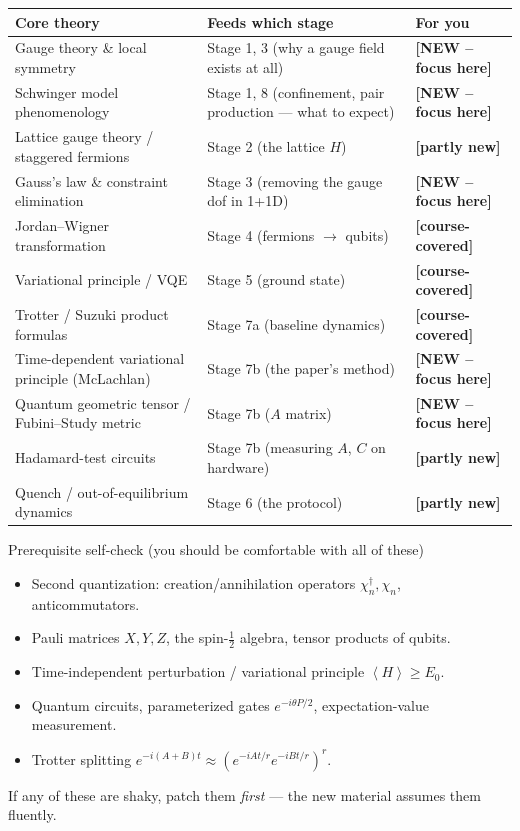 \documentclass[11pt,a4paper]{article}
\newcommand{\ev}[1]{\left\langle#1\right\rangle}
\newcommand{\half}{\tfrac{1}{2}}
\newcommand{\known}{\textcolor{green!55!black}{\textbf{[course-covered]}}}
\newcommand{\newx}{\textcolor{red!70!black}{\textbf{[NEW -- focus here]}}}
\newcommand{\partly}{\textcolor{orange!85!black}{\textbf{[partly new]}}}
\begin{document}
\begin{center}
\renewcommand{\arraystretch}{1.3}
\begin{longtable}{>{\raggedright\arraybackslash}p{} >{\raggedright\arraybackslash}p{} l}
\toprule
\textbf{Core theory} & \textbf{Feeds which stage} & \textbf{For you} \\
\midrule
\endhead
Gauge theory \& local symmetry & Stage 1, 3 (why a gauge field exists at all) & \newx \\
Schwinger model phenomenology & Stage 1, 8 (confinement, pair production --- what to expect) & \newx \\
Lattice gauge theory / staggered fermions & Stage 2 (the lattice $H$) & \partly \\
Gauss's law \& constraint elimination & Stage 3 (removing the gauge dof in 1+1D) & \newx \\
Jordan--Wigner transformation & Stage 4 (fermions $\to$ qubits) & \known \\
Variational principle / VQE & Stage 5 (ground state) & \known \\
Trotter / Suzuki product formulas & Stage 7a (baseline dynamics) & \known \\
Time-dependent variational principle (McLachlan) & Stage 7b (the paper's method) & \newx \\
Quantum geometric tensor / Fubini--Study metric & Stage 7b ($A$ matrix) & \newx \\
Hadamard-test circuits & Stage 7b (measuring $A$, $C$ on hardware) & \partly \\
Quench / out-of-equilibrium dynamics & Stage 6 (the protocol) & \partly \\
\bottomrule
\end{longtable}
\end{center}

\begin{checkbox}{Prerequisite self-check (you should be comfortable with all of these)}
\begin{itemize}[leftmargin=1.4em,nosep]
\item Second quantization: creation/annihilation operators $\chi^\dagger_n,\chi_n$, anticommutators.
\item Pauli matrices $X,Y,Z$, the spin-$\half$ algebra, tensor products of qubits.
\item Time-independent perturbation / variational principle $\ev{H}\ge E_0$.
\item Quantum circuits, parameterized gates $e^{-i\theta P/2}$, expectation-value measurement.
\item Trotter splitting $e^{-i(A+B)t}\approx (e^{-iA t/r}e^{-iB t/r})^r$.
\end{itemize}
If any of these are shaky, patch them \emph{first} --- the new material assumes them fluently.
\end{checkbox}
\end{document}
